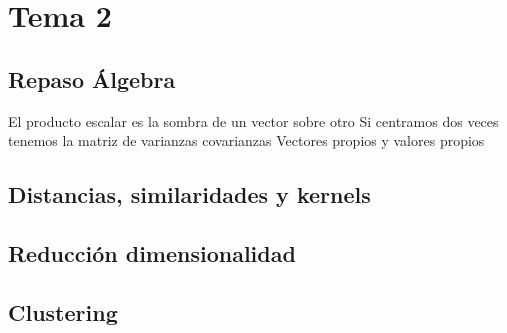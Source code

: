 \section{Tema 2}
\subsection{Repaso Álgebra}
El producto escalar es la sombra de un vector sobre otro
Si centramos dos veces tenemos la matriz de varianzas covarianzas
Vectores propios y valores propios



\subsection{Distancias, similaridades y kernels}
\subsection{Reducción dimensionalidad}
\subsection{Clustering}

